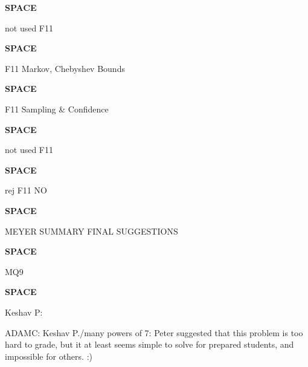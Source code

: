 \documentclass[quiz]{mcs}
\renewcommand{\examspace}{\textbf{SPACE}}
\begin{document}

\examspace 
\begin{editingnotes}not used F11\end{editingnotes}

\examspace   
\begin{editingnotes}F11 Markov, Chebyshev Bounds\end{editingnotes}


\examspace  
\begin{editingnotes}F11 Sampling \& Confidence\end{editingnotes}


\examspace
\begin{editingnotes}not used F11\end{editingnotes}

\examspace
\begin{editingnotes}rej F11 NO\end{editingnotes}


\examspace
\begin{editingnotes}MEYER SUMMARY FINAL SUGGESTIONS\end{editingnotes}



\examspace
\begin{editingnotes}MQ9\end{editingnotes}

\examspace
\begin{editingnotes}Keshav P:\end{editingnotes}

\begin{editingnotes}
ADAMC: Keshav P./many powers of 7: Peter suggested that this problem is too
hard to grade, but it at least seems simple to solve for prepared
students, and impossible for others. :)
\end{editingnotes}
\end{document}
